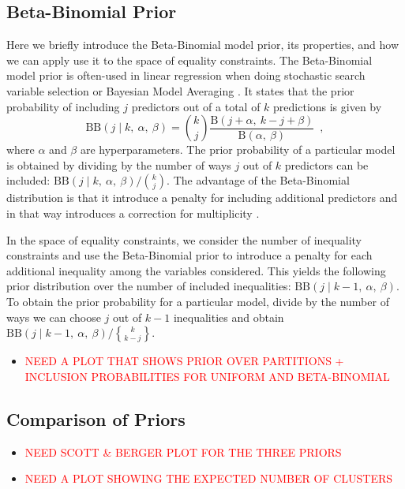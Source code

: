 \documentclass[11pt,a4paper]{article}
\theoremstyle{definition} %
\theoremstyle{case}
\newcommand{\FBeta}[2]{\text{B}\left({#1},\ {#2}\right)}
\newcommand{\BetaBinom}[4]{\text{BB}\left(#1 \mid #2 ,\ #3 ,\ #4 \right)}
\DeclareRobustCommand{\stirling}{\genfrac\{\}{0pt}{}}
\begin{document}
\subsection{Beta-Binomial Prior}
Here we briefly introduce the Beta-Binomial model prior, its properties, and how we can apply use it to the space of equality constraints. The Beta-Binomial model prior is often-used in linear regression when doing stochastic search variable selection \parencite[SSVS;][]{george1993variable} or Bayesian Model Averaging \parencite[BMA;][]{hinne2020conceptual, hoeting1999bayesian}. It states that the prior probability of including $j$ predictors out of a total of $k$ predictions is given by
\begin{equation}
    \BetaBinom{j}{k}{\alpha}{\beta} = \binom{k}{j} \frac{\FBeta{j + \alpha}{k - j + \beta}}{\FBeta{\alpha}{\beta}} \enspace ,
\end{equation}
where $\alpha$ and $\beta$ are hyperparameters. The prior probability of a particular model is obtained by dividing by the number of ways $j$ out of $k$ predictors can be included: $\BetaBinom{j}{k}{\alpha}{\beta} / \binom{k}{j}$. The advantage of the Beta-Binomial distribution is that it introduce a penalty for including additional predictors and in that way introduces a correction for multiplicity \parencite{scott2010bayes}.

In the space of equality constraints, we consider the number of inequality constraints and use the Beta-Binomial prior to introduce a penalty for each additional inequality among the variables considered. This yields the following prior distribution over the number of included inequalities: $\BetaBinom{j}{k-1}{\alpha}{\beta}$. To obtain the prior probability for a particular model, divide by the number of ways we can choose $j$ out of $k-1$ inequalities and obtain $\BetaBinom{j}{k-1}{\alpha}{\beta} / \stirling{k}{k-j}$.


\begin{itemize}
    \item \textcolor{red}{NEED A PLOT THAT SHOWS PRIOR OVER PARTITIONS + INCLUSION PROBABILITIES FOR UNIFORM AND BETA-BINOMIAL}
\end{itemize}

\subsection{Comparison of Priors}

\begin{itemize}
    \item \textcolor{red}{NEED SCOTT \& BERGER PLOT FOR THE THREE PRIORS}
    \item \textcolor{red}{NEED A PLOT SHOWING THE EXPECTED NUMBER OF CLUSTERS}
\end{itemize}
\end{document}
